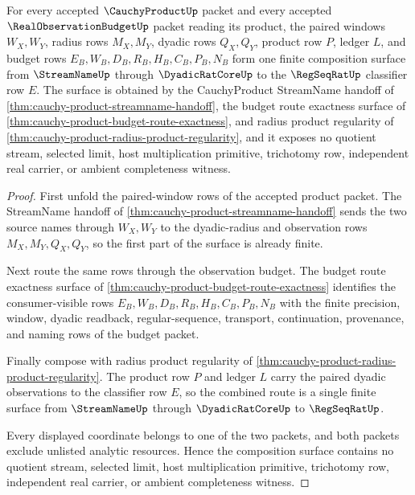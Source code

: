 \begin{theorem}
\label{thm:cauchy-product-window-budget-composition-surface}
For every accepted $\CauchyProductUp$ packet and every accepted $\RealObservationBudgetUp$ packet reading its product, the paired windows $W_X,W_Y$, radius rows $M_X,M_Y$, dyadic rows $Q_X,Q_Y$, product row $P$, ledger $L$, and budget rows $E_B,W_B,D_B,R_B,H_B,C_B,P_B,N_B$ form one finite composition surface from $\StreamNameUp$ through $\DyadicRatCoreUp$ to the $\RegSeqRatUp$ classifier row $E$. The surface is obtained by the CauchyProduct StreamName handoff of \autoref{thm:cauchy-product-streamname-handoff}, the budget route exactness surface of \autoref{thm:cauchy-product-budget-route-exactness}, and radius product regularity of \autoref{thm:cauchy-product-radius-product-regularity}, and it exposes no quotient stream, selected limit, host multiplication primitive, trichotomy row, independent real carrier, or ambient completeness witness.
\end{theorem}
\begin{proof}
First unfold the paired-window rows of the accepted product packet. The StreamName handoff of \autoref{thm:cauchy-product-streamname-handoff} sends the two source names through $W_X,W_Y$ to the dyadic-radius and observation rows $M_X,M_Y,Q_X,Q_Y$, so the first part of the surface is already finite.

Next route the same rows through the observation budget. The budget route exactness surface of \autoref{thm:cauchy-product-budget-route-exactness} identifies the consumer-visible rows $E_B,W_B,D_B,R_B,H_B,C_B,P_B,N_B$ with the finite precision, window, dyadic readback, regular-sequence, transport, continuation, provenance, and naming rows of the budget packet.

Finally compose with radius product regularity of \autoref{thm:cauchy-product-radius-product-regularity}. The product row $P$ and ledger $L$ carry the paired dyadic observations to the classifier row $E$, so the combined route is a single finite surface from $\StreamNameUp$ through $\DyadicRatCoreUp$ to $\RegSeqRatUp$.

Every displayed coordinate belongs to one of the two packets, and both packets exclude unlisted analytic resources. Hence the composition surface contains no quotient stream, selected limit, host multiplication primitive, trichotomy row, independent real carrier, or ambient completeness witness.
\end{proof}

